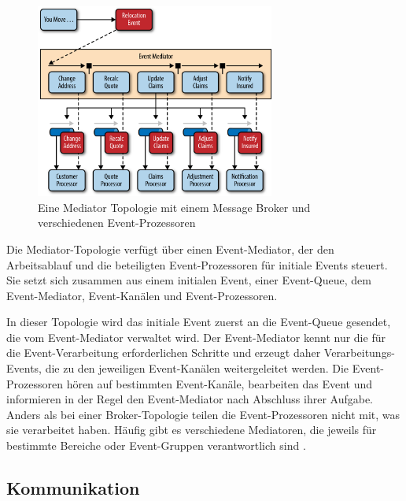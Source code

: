 {\begin{figure}[ht]
\centering
\includegraphics[width=0.7\textwidth]{bilder/k2/k2_mediator.png}
\caption[Darstellung einer Mediator-Topologie in der EDA]{Eine Mediator Topologie mit einem Message Broker und verschiedenen Event-Prozessoren \cite{richards}}
\end{figure}

Die Mediator-Topologie verfügt über einen \glqq Event-Mediator\grqq, der den Arbeitsablauf und die beteiligten Event-Prozessoren für initiale Events steuert. Sie setzt sich zusammen aus einem initialen Event, einer \glqq Event-Queue\grqq, dem Event-Mediator, Event-Kanälen und Event-Prozessoren.

In dieser Topologie wird das initiale Event zuerst an die Event-Queue gesendet, die vom Event-Mediator verwaltet wird. Der Event-Mediator kennt nur die für die Event-Verarbeitung erforderlichen Schritte und erzeugt daher Verarbeitungs-Events, die zu den jeweiligen Event-Kanälen weitergeleitet werden. Die Event-Prozessoren hören auf bestimmten Event-Kanäle, bearbeiten das Event und informieren in der Regel den Event-Mediator nach Abschluss ihrer Aufgabe. Anders als bei einer Broker-Topologie teilen die Event-Prozessoren nicht mit, was sie verarbeitet haben. Häufig gibt es verschiedene Mediatoren, die jeweils für bestimmte Bereiche oder Event-Gruppen verantwortlich sind \cite[S.189-190]{richards}.

\pagebreak
\subsection{Kommunikation}

}
